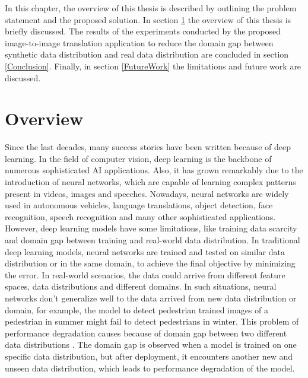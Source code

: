 \justifying
\setlength{\parskip}{1em}



In this chapter, the overview of this thesis is described by outlining the problem statement and the proposed solution. In section \ref{Overview} the overview of this thesis is briefly discussed. The results of the experiments conducted by the proposed image-to-image translation application to reduce the domain gap between synthetic data distribution and real data distribution are concluded in section \ref{Conclusion}. Finally, in section \ref{FutureWork} the limitations and future work are discussed.


\section{Overview}\label{Overview}

Since the last decades, many success stories have been written because of deep learning. In the field of computer vision, deep learning is the backbone of numerous sophisticated \ac{AI} applications. Also, it has grown remarkably due to the introduction of neural networks, which are capable of learning complex patterns present in videos, images and speeches. Nowadays, neural networks are widely used in autonomous vehicles, language translations, object detection, face recognition, speech recognition and many other sophisticated applications. However, deep learning models have some limitations, like training data scarcity and domain gap between training and real-world data distribution. In traditional deep learning models, neural networks are trained and tested on similar data distribution or in the same domain, to achieve the final objective by minimizing the error. In real-world scenarios, the data could arrive from different feature spaces, data distributions and different domains. In such situations, neural networks don't generalize well to the data arrived from new data distribution or domain, for example, the model to detect pedestrian trained images of a pedestrian in summer might fail to detect pedestrians in winter. This problem of performance degradation causes because of domain gap between two different data distributions \cite{farahani2020brief}. The domain gap is observed when a model is trained on one specific data distribution, but after deployment, it encounters another new and unseen data distribution, which leads to performance degradation of the model.

